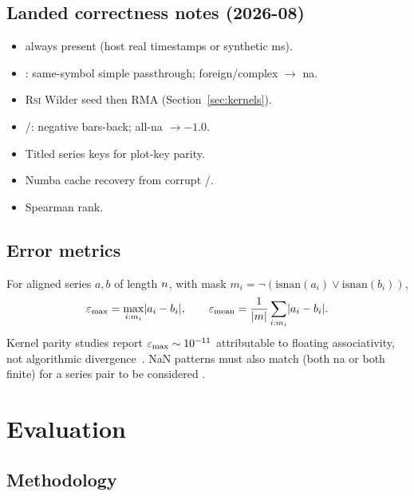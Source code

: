 \documentclass[11pt,a4paper]{article}
\renewcommand{\na}{\textsf{na}}
\begin{document}
\subsection{Landed correctness notes (2026-08)}

\begin{itemize}[leftmargin=*]
  \item {} always present (host real timestamps or synthetic ms).
  \item {}: same-symbol simple \ohlcv{} passthrough;
        foreign/complex $\to$ \na{}.
  \item \textsc{Rsi} Wilder seed then RMA (Section~\ref{sec:kernels}).
  \item {}/: negative bars-back; all-\na{}
        $\to -1.0$.
  \item Titled  series keys for plot-key parity.
  \item Numba cache recovery from corrupt /.
  \item {} Spearman rank.
\end{itemize}

\subsection{Error metrics}

For aligned series $a,b$ of length $n$, with mask
$m_i = \neg(\mathrm{isnan}(a_i)\lor\mathrm{isnan}(b_i))$,
\begin{equation}
  \varepsilon_{\mathrm{max}}
  =
  \max_{i:m_i} \lvert a_i - b_i \rvert,
  \qquad
  \varepsilon_{\mathrm{mean}}
  =
  \frac{1}{\lvert m\rvert}\sum_{i:m_i}\lvert a_i-b_i\rvert.
\end{equation}
Kernel parity studies report $\varepsilon_{\mathrm{max}} \sim 10^{-11}$ attributable to floating
associativity, not algorithmic divergence~\citep{higham2002accuracy,ieee754}.
NaN patterns must also match (both \na{} or both finite) for a series pair to
be considered .

\section{Evaluation}
\label{sec:eval}

\subsection{Methodology}
\end{document}
